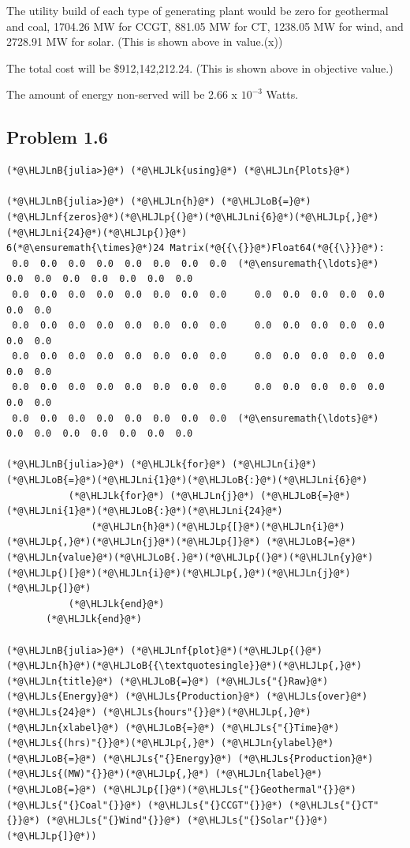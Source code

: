\documentclass[12pt,a4paper]{article}
\newcommand{\HLJLk}[1]{\textcolor[RGB]{148,91,176}{\textbf{#1}}}
\newcommand{\HLJLn}[1]{#1}
\newcommand{\HLJLnf}[1]{\textcolor[RGB]{66,102,213}{#1}}
\newcommand{\HLJLs}[1]{\textcolor[RGB]{201,61,57}{#1}}
\newcommand{\HLJLnB}[1]{\textcolor[RGB]{59,151,46}{#1}}
\newcommand{\HLJLni}[1]{\textcolor[RGB]{59,151,46}{#1}}
\newcommand{\HLJLoB}[1]{\textcolor[RGB]{102,102,102}{\textbf{#1}}}
\newcommand{\HLJLp}[1]{#1}
\begin{document}
The utility build of each type of generating plant would be zero for geothermal and coal, 1704.26 MW for CCGT, 881.05 MW for CT, 1238.05 MW for wind, and 2728.91 MW for solar. (This is shown above in value.(x))

The total cost will be \$912,142,212.24. (This is shown above in objective value.)

The amount of energy non-served will be 2.66 x $10^{-3}$ Watts.

\subsection{Problem 1.6}

\begin{lstlisting}
(*@\HLJLnB{julia>}@*) (*@\HLJLk{using}@*) (*@\HLJLn{Plots}@*)

(*@\HLJLnB{julia>}@*) (*@\HLJLn{h}@*) (*@\HLJLoB{=}@*) (*@\HLJLnf{zeros}@*)(*@\HLJLp{(}@*)(*@\HLJLni{6}@*)(*@\HLJLp{,}@*)(*@\HLJLni{24}@*)(*@\HLJLp{)}@*)
6(*@\ensuremath{\times}@*)24 Matrix(*@{{\{}}@*)Float64(*@{{\}}}@*):
 0.0  0.0  0.0  0.0  0.0  0.0  0.0  0.0  (*@\ensuremath{\ldots}@*)  0.0  0.0  0.0  0.0  0.0  0.0  0.0
 0.0  0.0  0.0  0.0  0.0  0.0  0.0  0.0     0.0  0.0  0.0  0.0  0.0  0.0  0.0
 0.0  0.0  0.0  0.0  0.0  0.0  0.0  0.0     0.0  0.0  0.0  0.0  0.0  0.0  0.0
 0.0  0.0  0.0  0.0  0.0  0.0  0.0  0.0     0.0  0.0  0.0  0.0  0.0  0.0  0.0
 0.0  0.0  0.0  0.0  0.0  0.0  0.0  0.0     0.0  0.0  0.0  0.0  0.0  0.0  0.0
 0.0  0.0  0.0  0.0  0.0  0.0  0.0  0.0  (*@\ensuremath{\ldots}@*)  0.0  0.0  0.0  0.0  0.0  0.0  0.0

(*@\HLJLnB{julia>}@*) (*@\HLJLk{for}@*) (*@\HLJLn{i}@*) (*@\HLJLoB{=}@*)(*@\HLJLni{1}@*)(*@\HLJLoB{:}@*)(*@\HLJLni{6}@*)
           (*@\HLJLk{for}@*) (*@\HLJLn{j}@*) (*@\HLJLoB{=}@*) (*@\HLJLni{1}@*)(*@\HLJLoB{:}@*)(*@\HLJLni{24}@*)
               (*@\HLJLn{h}@*)(*@\HLJLp{[}@*)(*@\HLJLn{i}@*)(*@\HLJLp{,}@*)(*@\HLJLn{j}@*)(*@\HLJLp{]}@*) (*@\HLJLoB{=}@*) (*@\HLJLn{value}@*)(*@\HLJLoB{.}@*)(*@\HLJLp{(}@*)(*@\HLJLn{y}@*)(*@\HLJLp{)[}@*)(*@\HLJLn{i}@*)(*@\HLJLp{,}@*)(*@\HLJLn{j}@*)(*@\HLJLp{]}@*)
           (*@\HLJLk{end}@*)
       (*@\HLJLk{end}@*)

(*@\HLJLnB{julia>}@*) (*@\HLJLnf{plot}@*)(*@\HLJLp{(}@*)(*@\HLJLn{h}@*)(*@\HLJLoB{{\textquotesingle}}@*)(*@\HLJLp{,}@*)(*@\HLJLn{title}@*) (*@\HLJLoB{=}@*) (*@\HLJLs{"{}Raw}@*) (*@\HLJLs{Energy}@*) (*@\HLJLs{Production}@*) (*@\HLJLs{over}@*) (*@\HLJLs{24}@*) (*@\HLJLs{hours"{}}@*)(*@\HLJLp{,}@*) (*@\HLJLn{xlabel}@*) (*@\HLJLoB{=}@*) (*@\HLJLs{"{}Time}@*) (*@\HLJLs{(hrs)"{}}@*)(*@\HLJLp{,}@*) (*@\HLJLn{ylabel}@*) (*@\HLJLoB{=}@*) (*@\HLJLs{"{}Energy}@*) (*@\HLJLs{Production}@*) (*@\HLJLs{(MW)"{}}@*)(*@\HLJLp{,}@*) (*@\HLJLn{label}@*)(*@\HLJLoB{=}@*) (*@\HLJLp{[}@*)(*@\HLJLs{"{}Geothermal"{}}@*) (*@\HLJLs{"{}Coal"{}}@*) (*@\HLJLs{"{}CCGT"{}}@*) (*@\HLJLs{"{}CT"{}}@*) (*@\HLJLs{"{}Wind"{}}@*) (*@\HLJLs{"{}Solar"{}}@*)(*@\HLJLp{]}@*))
\end{lstlisting}
\end{document}
